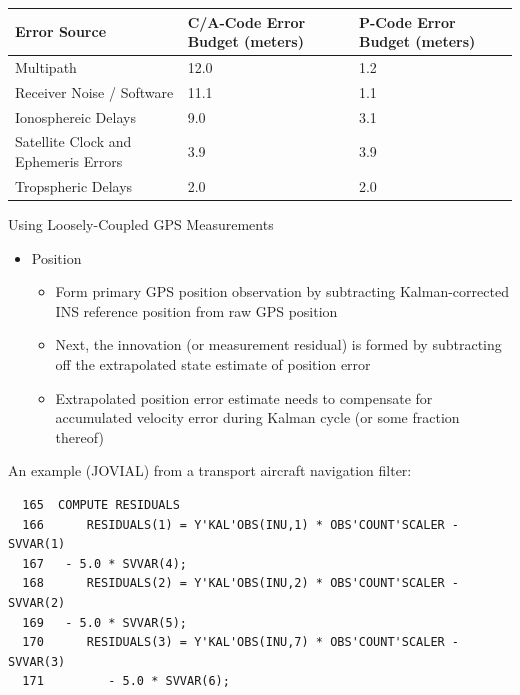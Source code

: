 \begin{frame}
\begin{center}
 \begin{tabular}{|p{3in}|p{1.5in}|p{1.5in}|} \hline
  \textbf{Error Source} & \textbf{C/A-Code Error Budget (meters)} & \textbf{P-Code Error Budget (meters)} \\ \hline
Multipath & 12.0 & 1.2 \\ \hline
Receiver Noise / Software & 11.1 & 1.1 \\ \hline
Ionosphereic Delays & 9.0 & 3.1 \\ \hline
Satellite Clock and  Ephemeris Errors & 3.9 & 3.9 \\ \hline
Tropspheric Delays & 2.0 & 2.0 \\ \hline
\end{tabular}
\end{center}
\end{frame}

\begin{frame}
Using Loosely-Coupled GPS Measurements
\begin{itemize}
  \item Position
	\begin{itemize}
		\item Form primary GPS position observation by subtracting Kalman-corrected INS reference position from raw GPS position
		\item Next, the innovation (or measurement residual) is formed by subtracting off the extrapolated state estimate of position error
		\item Extrapolated position error estimate needs to compensate for accumulated velocity error during Kalman cycle (or some fraction thereof) 
	\end{itemize}
\end{itemize} 
\end{frame}

\begin{frame}
An example (JOVIAL) from a transport aircraft navigation filter:
\end{frame}
\begin{verbatim}
  165  COMPUTE RESIDUALS 
  166      RESIDUALS(1) = Y'KAL'OBS(INU,1) * OBS'COUNT'SCALER - SVVAR(1)
  167 	- 5.0 * SVVAR(4);
  168      RESIDUALS(2) = Y'KAL'OBS(INU,2) * OBS'COUNT'SCALER - SVVAR(2)
  169 	- 5.0 * SVVAR(5);
  170      RESIDUALS(3) = Y'KAL'OBS(INU,7) * OBS'COUNT'SCALER - SVVAR(3)     
  171         - 5.0 * SVVAR(6);

\end{verbatim}

